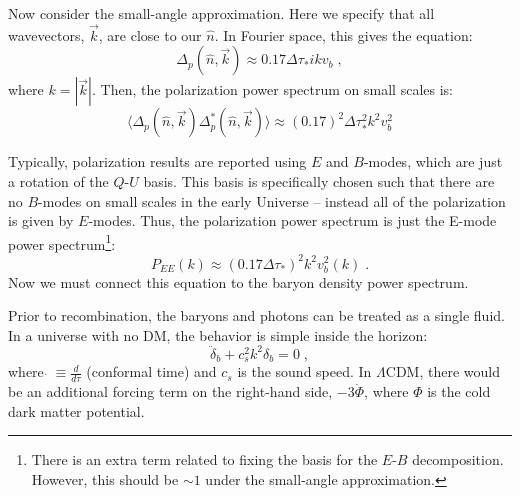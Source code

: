 \documentclass[floats,floatfix,showpacs,amssymb,amsmath,prl,twocolumn,superscriptaddress,nofootinbib, aps]{revtex4-2}
\begin{document}
Now consider the small-angle approximation. Here we specify that all wavevectors, $\vec{k}$, are close to our $\hat{n}$. In Fourier space, this gives the equation:
\begin{equation}
    \Delta_p(\hat{n}, \vec{k}) \approx 0.17 \Delta \tau_* ik v_b \; ,
\end{equation}
where $k = |\vec{k}|$. Then, the polarization power spectrum on small scales is:
\begin{equation}
    \langle \Delta_p(\hat{n}, \vec{k}) \Delta^*_p(\hat{n}, \vec{k}) \rangle \approx (0.17)^2 \Delta\tau_*^2 k^2 v_b^2
\end{equation}

Typically, polarization results are reported using $E$ and $B$-modes, which are just a rotation of the $Q$-$U$ basis. This basis is specifically chosen such that there are no $B$-modes on small scales in the early Universe -- instead all of the polarization is given by $E$-modes. Thus, the polarization power spectrum is just the E-mode power spectrum\footnote{There is an extra term related to fixing the basis for the $E$-$B$ decomposition. However, this should be $\sim 1$ under the small-angle approximation.}:
\begin{equation}\label{eqn:EEspec}
    P_{EE}(k) \approx (0.17 \Delta \tau_*)^2 k^2v^2_b(k) \; .
\end{equation}
Now we must connect this equation to the baryon density power spectrum. 

Prior to recombination, the baryons and photons can be treated as a single fluid. In a universe with no DM, the behavior is simple inside the horizon:
\begin{equation}
 \ddot{\delta}_b + c_s^2 k^2 \delta_b = 0  \; ,
\end{equation}
where $\dot{}~ \equiv \frac{d}{d\tau}$ (conformal time) and $c_s$ is the sound speed. In $\Lambda$CDM, there would be an additional forcing term on the right-hand side, $-3\dot{\Phi}$, where $\Phi$ is the cold dark matter potential.
\end{document}
